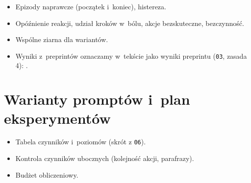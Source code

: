 \begin{planroboczy}[ok. 1 s.]
\begin{itemize}
  \item Epizody naprawcze (początek i~koniec), histereza.
  \item Opóźnienie reakcji, udział kroków w~bólu, akcje bezskuteczne, bezczynność.
  \item Wspólne ziarna dla wariantów.
  \item Wyniki z~preprintów oznaczamy w~tekście jako wyniki preprintu (\texttt{03}, zasada 4): \cite{masumori2025survival}.
\end{itemize}

\end{planroboczy}

\section{Warianty promptów i~plan eksperymentów}
\label{sec:4-6}

\begin{planroboczy}[ok. 0,5 s.]
\begin{itemize}
  \item Tabela czynników i~poziomów (skrót z \texttt{06}).
  \item Kontrola czynników ubocznych (kolejność akcji, parafrazy).
  \item Budżet obliczeniowy.
\end{itemize}

\end{planroboczy}

